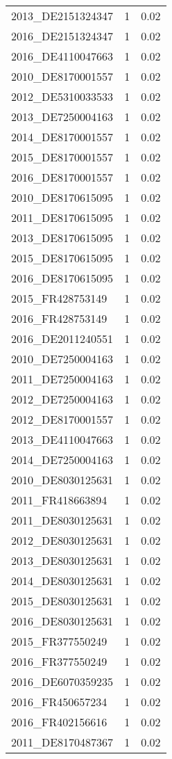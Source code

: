 \begin{table*}[htbp]
\begin{tabular}{lrr}
2013_DE2151324347 & 1 & 0.02 \\
2016_DE2151324347 & 1 & 0.02 \\
2016_DE4110047663 & 1 & 0.02 \\
2010_DE8170001557 & 1 & 0.02 \\
2012_DE5310033533 & 1 & 0.02 \\
2013_DE7250004163 & 1 & 0.02 \\
2014_DE8170001557 & 1 & 0.02 \\
2015_DE8170001557 & 1 & 0.02 \\
2016_DE8170001557 & 1 & 0.02 \\
2010_DE8170615095 & 1 & 0.02 \\
2011_DE8170615095 & 1 & 0.02 \\
2013_DE8170615095 & 1 & 0.02 \\
2015_DE8170615095 & 1 & 0.02 \\
2016_DE8170615095 & 1 & 0.02 \\
2015_FR428753149 & 1 & 0.02 \\
2016_FR428753149 & 1 & 0.02 \\
2016_DE2011240551 & 1 & 0.02 \\
2010_DE7250004163 & 1 & 0.02 \\
2011_DE7250004163 & 1 & 0.02 \\
2012_DE7250004163 & 1 & 0.02 \\
2012_DE8170001557 & 1 & 0.02 \\
2013_DE4110047663 & 1 & 0.02 \\
2014_DE7250004163 & 1 & 0.02 \\
2010_DE8030125631 & 1 & 0.02 \\
2011_FR418663894 & 1 & 0.02 \\
2011_DE8030125631 & 1 & 0.02 \\
2012_DE8030125631 & 1 & 0.02 \\
2013_DE8030125631 & 1 & 0.02 \\
2014_DE8030125631 & 1 & 0.02 \\
2015_DE8030125631 & 1 & 0.02 \\
2016_DE8030125631 & 1 & 0.02 \\
2015_FR377550249 & 1 & 0.02 \\
2016_FR377550249 & 1 & 0.02 \\
2016_DE6070359235 & 1 & 0.02 \\
2016_FR450657234 & 1 & 0.02 \\
2016_FR402156616 & 1 & 0.02 \\
2011_DE8170487367 & 1 & 0.02 \\

\end{tabular}
\end{table*}
